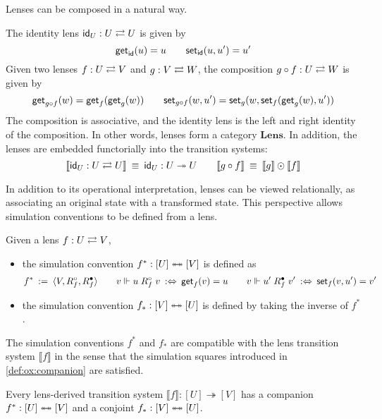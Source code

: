 Lenses can be composed in a natural way.
\begin{definition}
  \label{ox:def:lens-comp}
  The identity lens $ \mathsf{id} _U : U \rightleftarrows U$
  is given by
  \[
     \mathsf{get} _{ \mathsf{id} }(u) = u
    \qquad
     \mathsf{set} _{ \mathsf{id} }(u, u') = u'
  \]
  Given two lenses $f : U \rightleftarrows V$ and $g : V \rightleftarrows W$,
  the composition $g \circ f : U \rightleftarrows W$
  is given by
  \[
     \mathsf{get} _{g \circ f}(w) =  \mathsf{get} _f( \mathsf{get} _g(w))
    \qquad
     \mathsf{set} _{g \circ f}(w, u') =  \mathsf{set} _g(w,  \mathsf{set} _f( \mathsf{get} _g(w), u'))
  \]
  The composition is associative,
  and the identity lens is the left and right identity of the composition.
  In other words,
  lenses form a category $\mathbf{Lens}$.
  In addition,
  the lenses are embedded functorially
  into the transition systems:
  \[
    \llbracket  \mathsf{id} _U : U \rightleftarrows U \rrbracket \:\equiv\:  \mathsf{id} _{U} : U \twoheadrightarrow U
    \qquad
    \llbracket g \circ f \rrbracket \:\equiv\: \llbracket g \rrbracket \odot \llbracket f \rrbracket
  \]
\end{definition}

In addition to its operational interpretation,
lenses can be viewed relationally,
as associating an original state with a transformed state.
This perspective allows
simulation conventions to be defined from a lens.
\begin{definition}
  \label{ox:def:sc-lens}
  Given a lens $f : U \rightleftarrows V$,
  \begin{itemize}
    \item
      the simulation convention $f^* : [U] \twoheadleftarrow \mathrel{\mkern-15mu} \twoheadrightarrow [V]$
      is defined as
      \[
        f^* \::=\: \langle V, R_f^\circ, R_f^\bullet \rangle
        \qquad
        v \Vdash u \mathrel{R_f^\circ} v \::\Leftrightarrow\:  \mathsf{get} _f(v) = u
        \qquad
        v \Vdash u' \mathrel{R_f^\bullet} v' \::\Leftrightarrow\:  \mathsf{set} _f(v, u') = v'
      \]
    \item
      the simulation convention $f_* : [V] \twoheadleftarrow \mathrel{\mkern-15mu} \twoheadrightarrow [U]$
      is defined by taking the inverse of $f^*$.
  \end{itemize}
\end{definition}

The simulation conventions $f^*$ and $f_*$
are compatible with the lens transition system
$\llbracket f \rrbracket$
in the sense that
the simulation squares
introduced in \autoref{def:ox:companion}
are satisfied.
\begin{theorem}
  Every lens-derived transition system
  $\llbracket f \rrbracket : [U] \twoheadrightarrow [V]$
  has a companion $f^* : [U] \twoheadleftarrow \mathrel{\mkern-15mu} \twoheadrightarrow [V]$
  and a conjoint $f_* : [V] \twoheadleftarrow \mathrel{\mkern-15mu} \twoheadrightarrow [U]$.
\end{theorem}

